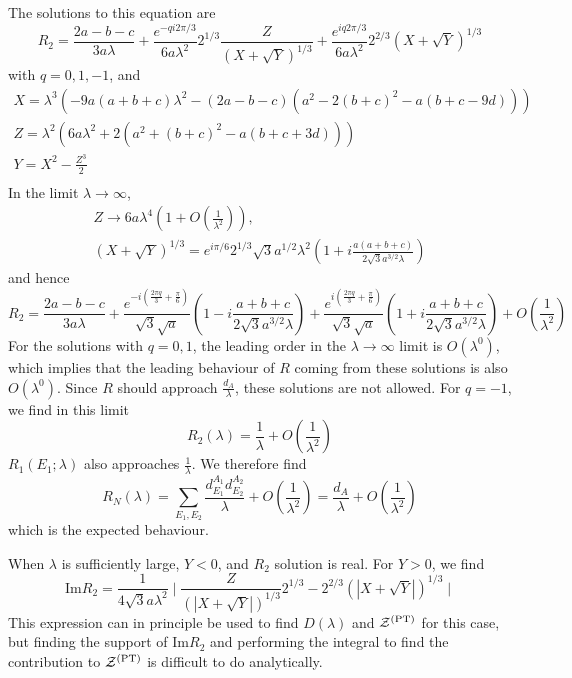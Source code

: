 \documentclass[a4paper,11pt]{article}
\newcommand{\be}{\begin{equation}}
\newcommand{\ee}{\end{equation}}
\newcommand\sZ{{\mathcal Z}}
\begin{document}
\begin{enumerate}
\begin{appendix}
The solutions to this equation are 
\be 
R_2 =
\frac{2a-b-c}{3 a \lambda} + \frac{e^{- q i 2 \pi/3}}{6 a \lambda^2} 2^{1/3} \frac{Z}{(X+ \sqrt{Y})^{1/3}} + \frac{e^{i q 2 \pi/3}}{6 a \lambda^2} 2^{2/3} (X+ \sqrt{Y})^{1/3}
\ee
with $q = 0, 1, -1$, and 
\be 
\begin{gathered} 
X = \lambda^3 (- 9 a (a+b+c)\lambda^2 -(2a -b -c)(a^2 - 2(b+c)^2 -a(b+c-9d))) \\
Z = \lambda^2 (6 a \lambda^2 + 2(a^2 +(b+c)^2 - a(b+c+3d)))\\
Y = X^2 - \frac{Z^3}{2} \\
\end{gathered} 
\ee
In the limit $\lambda\rightarrow \infty$, 
\be
\begin{gathered} 
Z \rightarrow 6 a \lambda^4 (1 + O(\frac{1}{\lambda^2})), \\
(X+ \sqrt{Y})^{1/3} = e^{i \pi/6} 2^{1/3} \sqrt{3} a^{1/2} \lambda^2 (1+ i \frac{a(a+b+c)}{2\sqrt{3} a^{3/2}\lambda})
\end{gathered} 
\ee
and hence 
\be 
R_2 = \frac{2a-b-c}{3 a \lambda} + \frac{e^{-i(\frac{2 \pi q}{3} + \frac{\pi}{6})}}{\sqrt{3}\sqrt{a}} (1 - i \frac{a+b+c}{2\sqrt{3} a^{3/2}\lambda}) + \frac{e^{i(\frac{2 \pi q}{3} + \frac{\pi}{6})}}{\sqrt{3}\sqrt{a}} (1 + i \frac{a+b+c}{2\sqrt{3} a^{3/2}\lambda}) + O\left(\frac{1}{\lambda^2}\right)
\ee
For the solutions with $q=0, 1$, the leading order in the $\lambda \rightarrow \infty$ limit is $O(\lambda^0)$, which implies that the leading behaviour of $R$ coming from these solutions is also $O(\lambda^0)$. Since $R$ should approach $\frac{d_A}{\lambda}$, these solutions are not allowed. For $q=-1$, we find in this limit
\be 
R_2(\lambda) = \frac{1}{\lambda} + O(\frac{1}{\lambda^2})
\ee
$R_1(E_1;\lambda)$ also approaches $\frac{1}{\lambda}$. We therefore find 
\be 
R_N(\lambda) = \sum_{E_{1}, E_{2}} \frac{d^{A_1}_{E_1} d^{A_2}_{E_2}}{\lambda} + O(\frac{1}{\lambda^2})= \frac{d_A}{\lambda} + O(\frac{1}{\lambda^2})
\ee
which is the expected behaviour. 

When $\lambda$ is sufficiently large, $Y<0$, and $R_2$ solution is real. For $Y>0$, we find 
\be 
\text{Im} R_2 = \frac{1}{4\sqrt{3} a \lambda^2} \mid \frac{Z}{(|X+ \sqrt{Y}|)^{1/3}} 2^{1/3} - 2^{2/3} (|X+ \sqrt{Y}|)^{1/3} \mid
\ee
This expression can in principle be used to find $D(\lambda)$ and $\sZ^{\rm (PT)}$ for this case, but finding the support of $\text{Im} R_2$ and performing the integral to find the contribution to $\sZ^{\rm (PT)}$ is difficult to do analytically. 



\end{appendix}
\end{enumerate}
\end{document}
